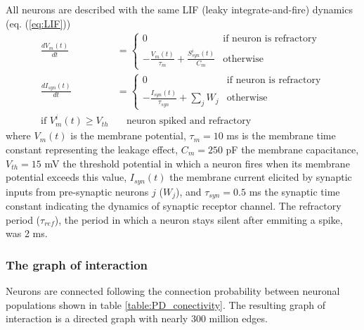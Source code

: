 \documentclass[11pt]{scrartcl}
\begin{document}
All neurons are described with the same LIF (leaky integrate-and-fire) dynamics (eq. (\ref{eq:LIF}))
\begin{equation}
  \begin{aligned}
    \frac{dV_m(t)}{dt} &= \begin{cases} 0 & \text{if neuron is refractory} \\
    -\frac{V_m(t)}{\tau_m} + \frac{S_{syn}^i(t)}{C_m} & \text{otherwise}
    \end{cases} \\
    \frac{dI_{syn}(t)}{dt} &= \begin{cases} 0 & \text{if neuron is refractory} \\
    -\frac{I_{syn}(t)}{\tau_{syn}} + \sum_j{W_j} & \text{otherwise}
    \end{cases} \\
    \text{if } V_m^i(t) \geq V_{th} &\quad \text{neuron spiked and refractory}
  \end{aligned}
  \label{eq:LIF}
\end{equation}
where \(V_m(t)\) is the membrane potential, \(\tau_m = 10\) ms is the membrane time constant representing the leakage effect, \(C_m = 250\) pF the membrane capacitance, \(V_{th} = 15\) mV the threshold potential in which a neuron fires when its membrane potential exceeds this value, \(I_{syn}(t)\) the membrane current elicited by synaptic inputs from pre-synaptic neurons  \(j\) (\(W_j\)), and \(\tau_{syn} = 0.5\) ms the synaptic time constant indicating the dynamics of synaptic receptor channel. The refractory period (\(\tau_{ref}\)), the period in which a neuron stays silent after emmiting a spike, was 2 ms.


\subsubsection{The graph of interaction}
\label{sec:org0b83022}
\label{orgcf3250b}

Neurons are connected following the connection probability between neuronal populations shown in table \ref{table:PD_conectivity}.
The resulting graph of interaction is a directed graph with nearly 300 million edges.
\end{document}

